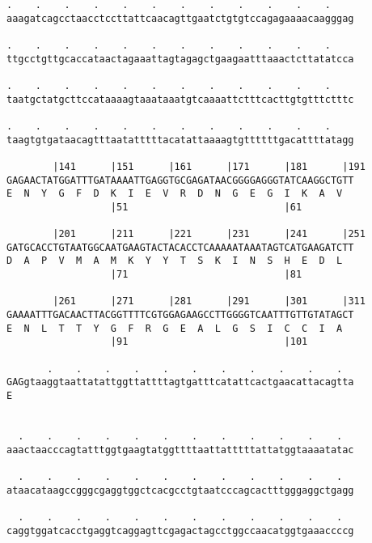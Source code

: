 \documentclass{article}
\begin{document}
\begin{Verbatim}
.    .    .    .    .    .    .    .    .    .    .    .    
aaagatcagcctaacctccttattcaacagttgaatctgtgtccagagaaaacaagggag
                                                            
.    .    .    .    .    .    .    .    .    .    .    .    
ttgcctgttgcaccataactagaaattagtagagctgaagaatttaaactcttatatcca
                                                            
.    .    .    .    .    .    .    .    .    .    .    .    
taatgctatgcttccataaaagtaaataaatgtcaaaattctttcacttgtgtttctttc
                                                            
.    .    .    .    .    .    .    .    .    .    .    .    
taagtgtgataacagtttaatatttttacatattaaaagtgttttttgacattttatagg
                                                            
        |141      |151      |161      |171      |181      |191
GAGAACTATGGATTTGATAAAATTGAGGTGCGAGATAACGGGGAGGGTATCAAGGCTGTT
E  N  Y  G  F  D  K  I  E  V  R  D  N  G  E  G  I  K  A  V  
                  |51                           |61         
  
        |201      |211      |221      |231      |241      |251
GATGCACCTGTAATGGCAATGAAGTACTACACCTCAAAAATAAATAGTCATGAAGATCTT
D  A  P  V  M  A  M  K  Y  Y  T  S  K  I  N  S  H  E  D  L  
                  |71                           |81         
  
        |261      |271      |281      |291      |301      |311
GAAAATTTGACAACTTACGGTTTTCGTGGAGAAGCCTTGGGGTCAATTTGTTGTATAGCT
E  N  L  T  T  Y  G  F  R  G  E  A  L  G  S  I  C  C  I  A  
                  |91                           |101        
  
       .    .    .    .    .    .    .    .    .    .    .  
GAGgtaaggtaattatattggttattttagtgatttcatattcactgaacattacagtta
E                                                           
                                                            
  
  .    .    .    .    .    .    .    .    .    .    .    .  
aaactaacccagtatttggtgaagtatggttttaattatttttattatggtaaaatatac
                                                            
  .    .    .    .    .    .    .    .    .    .    .    .  
ataacataagccgggcgaggtggctcacgcctgtaatcccagcactttgggaggctgagg
                                                            
  .    .    .    .    .    .    .    .    .    .    .    .  
caggtggatcacctgaggtcaggagttcgagactagcctggccaacatggtgaaaccccg
                                                            

\end{Verbatim}
\end{document}
